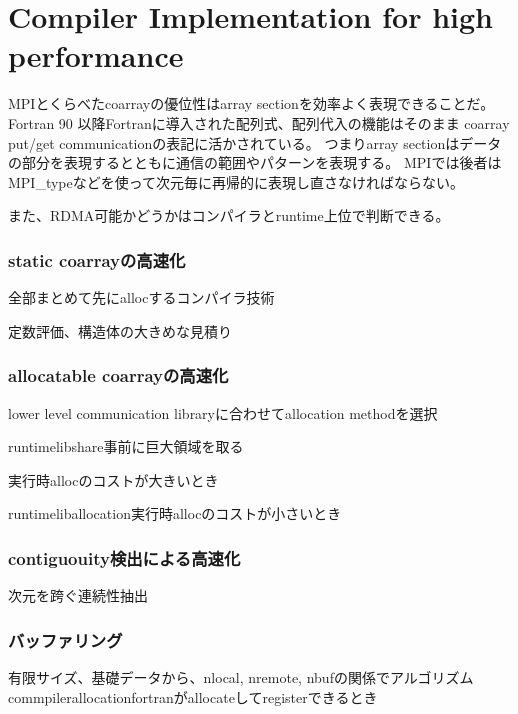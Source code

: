 \section{Compiler Implementation for high performance}\label{sec:compiler}

MPIとくらべたcoarrayの優位性はarray sectionを効率よく表現できることだ。
Fortran 90 以降Fortranに導入された配列式、配列代入の機能はそのまま
coarray put/get communicationの表記に活かされている。
つまりarray sectionはデータの部分を表現するとともに通信の範囲やパターンを表現する。
MPIでは後者はMPI\_typeなどを使って次元毎に再帰的に表現し直さなければならない。

また、RDMA可能かどうかはコンパイラとruntime上位で判断できる。



\subsubsection{static coarrayの高速化}

全部まとめて先にallocするコンパイラ技術

定数評価、構造体の大きめな見積り

\subsubsection{allocatable coarrayの高速化}

lower level communication libraryに合わせてallocation methodを選択

runtimelibshare事前に巨大領域を取る

実行時allocのコストが大きいとき


runtimeliballocation実行時allocのコストが小さいとき

\subsubsection{contiguouity検出による高速化}
次元を跨ぐ連続性抽出

\subsubsection{バッファリング}
有限サイズ、基礎データから、nlocal, nremote, nbufの関係でアルゴリズム
commpilerallocationfortranがallocateしてregisterできるとき



